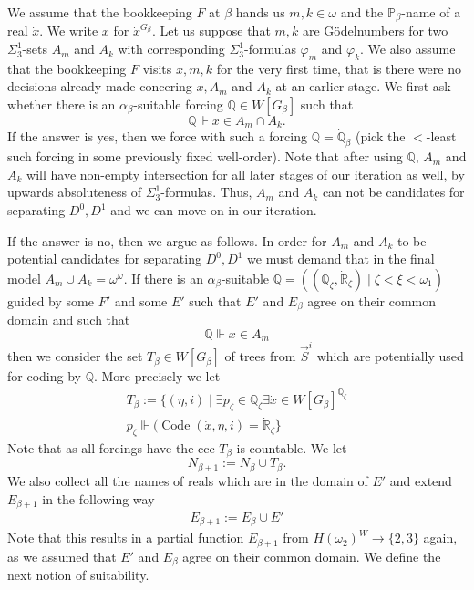\documentclass[a4paper,11pt]{article}
\newcommand{\forceP}{\mathbb{P}}
\newcommand{\forceQ}{\mathbb{Q}}
\newcommand{\forceR}{\mathbb{R}}
\begin{document}
{We assume that the bookkeeping $F$ at $\beta$ hands us $m,k \in \omega$ and the $\forceP_{\beta}$-name of a real $\dot{x}$. We write $x$ for $\dot{x}^{G_{\beta}}$.
Let us suppose that $m,k$ are G\"odelnumbers for two $\Sigma^1_3$-sets $A_m$ and $A_k$ with corresponding $\Sigma^1_3$-formulas $\varphi_m$ and $\varphi_k$.
We also assume that the bookkeeping $F$ visits $x,m,k$ for the very first time, that is there were no decisions already made concering $x,A_m$ and $A_k$ at an earlier stage.
We first ask whether there is an $\alpha_{\beta}$-suitable forcing $\forceQ \in W[G_{\beta}]$ such that 
\[ \forceQ \Vdash x \in A_m \cap A_k. \]
If the answer is yes, then we force with such a forcing $\forceQ= \dot{\forceQ}_{\beta}$ (pick the $<$-least such forcing in some previously fixed well-order). Note that after using $\forceQ$, $A_m$ and $A_k$ will have non-empty intersection for all later stages of our iteration as well, by upwards absoluteness of $\Sigma^1_3$-formulas. Thus, $A_m$ and $A_k$ can not be candidates for separating $D^0,D^1$ and we can move on in our iteration.

If the answer is no, then we argue as follows. In order for $A_m$ and $A_k$ to be potential candidates for separating $D^0,D^1$ we must demand that in the final model $A_m \cup A_k = \omega^{\omega}$. If there is an $\alpha_{\beta}$-suitable $\forceQ= ((\forceQ_{\zeta}, \dot{\mathbb{R}}_{\zeta}) \mid \zeta < \xi<\omega_1)$ guided by some $F'$ and some $E'$ such that $E'$ and $E_{\beta}$ agree on their common domain  and such that
\[ \forceQ \Vdash x \in A_m \]
then we consider the set $T_{\beta} \in W[G_{\beta}]$ of trees from $\vec{S}^i$ which are potentially used for coding by $\forceQ$. More precisely we let
\begin{align*}
T_{\beta} := \{ (\eta,i) \mid \exists  p_{\zeta} \in \forceQ_{\zeta} \exists \dot{x} \in W[G_{\beta}]^{\forceQ_{\zeta}} \\ p_{\zeta} \Vdash (\operatorname{Code} (\dot{x},\eta,i)=\dot{\forceR}_{\zeta} \}
\end{align*}
Note that as all forcings have the ccc $T_{\beta}$ is countable.
We let 
\[N_{\beta+1}:= N_{\beta} \cup T_{\beta}.\]
We also collect all the names of reals which are in the domain of $E'$ and extend $E_{\beta+1}$ in the following way
\begin{align*}
E_{\beta+1}:= E_{\beta} \cup E'
\end{align*}
Note that this results in a partial function $E_{\beta+1}$ from $H(\omega_2)^W \rightarrow \{2,3\}$ again, as we assumed that $E'$ and $E_{\beta}$ agree on their common domain. We define the next notion of suitability.

}
\end{document}
